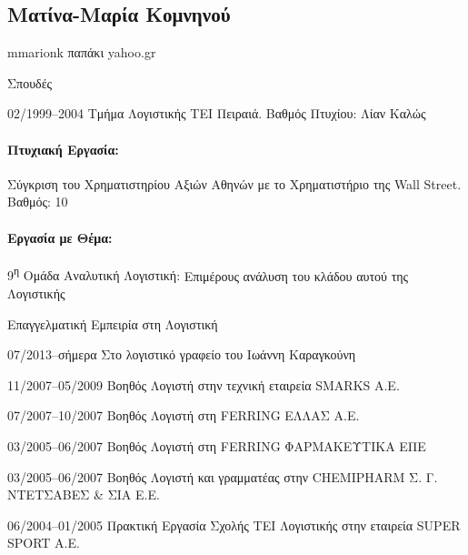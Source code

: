 \documentclass[a4paper]{article}
\begin{document}

\begin{cv}{}

\begin{center}
  \section*{Ματίνα-Μαρία Κομνηνού}
  mmarionk παπάκι yahoo.gr
\end{center}

\begin{cvlist}{Σπουδές}
  \item[02/1999–2004] \textsf{Τμήμα Λογιστικής} ΤΕΙ Πειραιά.
                      Βαθμός Πτυχίου: Λίαν Καλώς
\end{cvlist}

\paragraph{Πτυχιακή Εργασία:} \textsf{Σύγκριση του
Χρηματιστηρίου Αξιών Αθηνών με το Χρηματιστήριο της Wall
Street.} Βαθμός: 10

\paragraph{Εργασία με Θέμα:} \textsf{9\textsuperscript{η}
Ομάδα Αναλυτική Λογιστική:} Επιμέρους ανάλυση του κλάδου
αυτού της Λογιστικής

\begin{cvlist}{Επαγγελματική Εμπειρία στη Λογιστική}
  \item[07/2013–σήμερα] Στο λογιστικό γραφείο του
                        \textsf{Ιωάννη Καραγκούνη}
  \item[11/2007–05/2009] Βοηθός Λογιστή στην τεχνική
                         εταιρεία \textsf{SMARKS Α.Ε.}
  \item[07/2007–10/2007] Βοηθός Λογιστή στη \textsf{FERRING
                         ΕΛΛΑΣ Α.Ε.}
  \item[03/2005–06/2007] Βοηθός Λογιστή στη \textsf{FERRING
                          ΦΑΡΜΑΚΕΥΤΙΚΑ ΕΠΕ}
  \item[03/2005–06/2007] Βοηθός Λογιστή και γραμματέας στην
                         \textsf{CHE\-MI\-PHARM Σ. Γ.
                         ΝΤΕΤΣΑΒΕΣ \& ΣΙΑ Ε.Ε.}
  \item[06/2004–01/2005] Πρακτική Εργασία Σχολής ΤΕΙ
                         Λογιστικής στην εταιρεία
                         \textsf{SUPER SPORT Α.Ε.}
\end{cvlist}


\end{cv}
\end{document}
